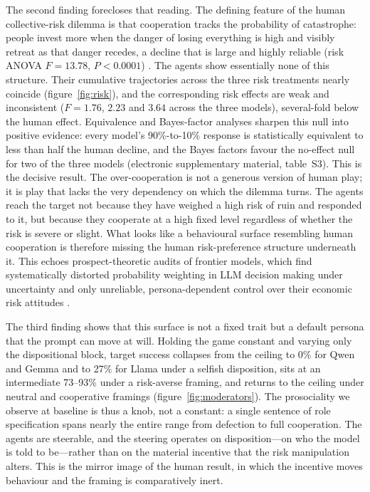 \documentclass[openacc]{rsproca_new}
\begin{document}
The second finding forecloses that reading. The defining feature of the human collective-risk dilemma is that cooperation tracks the probability of catastrophe: people invest more when the danger of losing everything is high and visibly retreat as that danger recedes, a decline that is large and highly reliable (risk ANOVA $F=13.78$, $P<0.0001$) \cite{milinski2008climate}. The agents show essentially none of this structure. Their cumulative trajectories across the three risk treatments nearly coincide (figure~\ref{fig:risk}), and the corresponding risk effects are weak and inconsistent ($F=1.76$, $2.23$ and $3.64$ across the three models), several-fold below the human effect. Equivalence and Bayes-factor analyses sharpen this null into positive evidence: every model's 90\%-to-10\% response is statistically equivalent to less than half the human decline, and the Bayes factors favour the no-effect null for two of the three models (electronic supplementary material, table~S3). This is the decisive result. The over-cooperation is not a generous version of human play; it is play that lacks the very dependency on which the dilemma turns. The agents reach the target not because they have weighed a high risk of ruin and responded to it, but because they cooperate at a high fixed level regardless of whether the risk is severe or slight. What looks like a behavioural surface resembling human cooperation is therefore missing the human risk-preference structure underneath it. This echoes prospect-theoretic audits of frontier models, which find systematically distorted probability weighting in LLM decision making under uncertainty \cite{jia2024decision} and only unreliable, persona-dependent control over their economic risk attitudes \cite{liu2025aligning}.

The third finding shows that this surface is not a fixed trait but a default persona that the prompt can move at will. Holding the game constant and varying only the dispositional block, target success collapses from the ceiling to 0\% for Qwen and Gemma and to 27\% for Llama under a selfish disposition, sits at an intermediate 73--93\% under a risk-averse framing, and returns to the ceiling under neutral and cooperative framings (figure~\ref{fig:moderators}). The prosociality we observe at baseline is thus a knob, not a constant: a single sentence of role specification spans nearly the entire range from defection to full cooperation. The agents are steerable, and the steering operates on disposition---on who the model is told to be---rather than on the material incentive that the risk manipulation alters. This is the mirror image of the human result, in which the incentive moves behaviour and the framing is comparatively inert.
\end{document}
